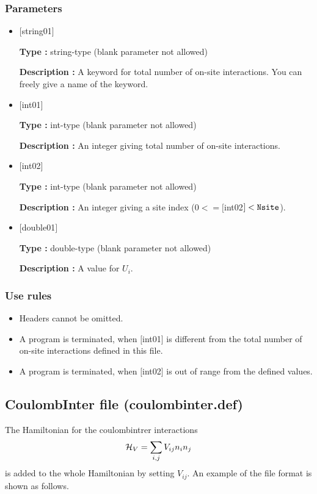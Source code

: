 \subsubsection{Parameters}
 \begin{itemize}

   \item  $[$string01$]$
   
    {\bf Type :} string-type (blank parameter not allowed)

   {\bf Description :} A keyword for total number of on-site interactions. You can freely give a name of the keyword.

   \item  $[$int01$]$
   
    {\bf Type :} int-type (blank parameter not allowed)

   {\bf Description :} An integer giving total number of on-site interactions.

  \item  $[$int02$]$
  
 {\bf Type :} int-type (blank parameter not allowed)

{\bf Description :} An integer giving a site index ($0<= [$int02$]<\verb|Nsite|$).
 
 \item  $[$double01$]$
   
   {\bf Type :} double-type (blank parameter not allowed)

  {\bf Description :}  A value for $U_i$.

\end{itemize}

\subsubsection{Use rules}
\begin{itemize}
\item Headers cannot be omitted. 
\item A program is terminated, when $[$int01$]$ is different from the total number of on-site interactions defined in this file.
\item A program is terminated, when $[$int02$]$ is out of range from the defined values.
\end{itemize}

\newpage
\subsection{CoulombInter file (coulombinter.def)}
The Hamiltonian for the coulombintrer interactions
\begin{equation}
{\cal H}_V = \sum_{i,j}V_{ij} n_ {i} n_{j}
\end{equation}
is added to the whole Hamiltonian by setting $V_{ij}$.
An example of the file format is shown as follows.

